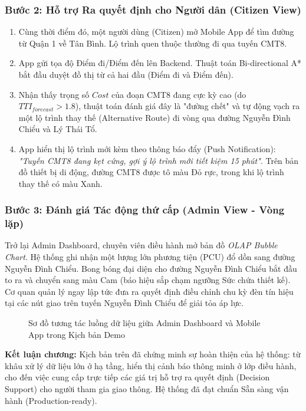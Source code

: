 \subsubsection{Bước 2: Hỗ trợ Ra quyết định cho Người dân (Citizen View)}
\begin{enumerate}
    \item Cùng thời điểm đó, một người dùng (Citizen) mở Mobile App để tìm đường từ Quận 1 về Tân Bình. Lộ trình quen thuộc thường đi qua tuyến CMT8.
    \item App gửi tọa độ Điểm đi/Điểm đến lên Backend. Thuật toán Bi-directional A* bắt đầu duyệt đồ thị từ cả hai đầu (Điểm đi và Điểm đến).
    \item Nhận thấy trọng số $Cost$ của đoạn CMT8 đang cực kỳ cao (do $TTI_{forecast} > 1.8$), thuật toán đánh giá đây là "đường chết" và tự động vạch ra một lộ trình thay thế (Alternative Route) đi vòng qua đường Nguyễn Đình Chiểu và Lý Thái Tổ.
    \item App hiển thị lộ trình mới kèm theo thông báo đẩy (Push Notification): \textit{"Tuyến CMT8 đang kẹt cứng, gợi ý lộ trình mới tiết kiệm 15 phút"}. Trên bản đồ thiết bị di động, đường CMT8 được tô màu Đỏ rực, trong khi lộ trình thay thế có màu Xanh.
\end{enumerate}

\subsubsection{Bước 3: Đánh giá Tác động thứ cấp (Admin View - Vòng lặp)}
Trở lại Admin Dashboard, chuyên viên điều hành mở bản đồ \textit{OLAP Bubble Chart}. Hệ thống ghi nhận một lượng lớn phương tiện (PCU) đổ dồn sang đường Nguyễn Đình Chiểu. Bong bóng đại diện cho đường Nguyễn Đình Chiểu bắt đầu to ra và chuyển sang màu Cam (báo hiệu sắp chạm ngưỡng Sức chứa thiết kế). Cơ quan quản lý ngay lập tức đưa ra quyết định điều chỉnh chu kỳ đèn tín hiệu tại các nút giao trên tuyến Nguyễn Đình Chiểu để giải tỏa áp lực.

\begin{figure}[H]
    \centering
    \caption{Sơ đồ tương tác luồng dữ liệu giữa Admin Dashboard và Mobile App trong Kịch bản Demo}
    \label{fig:demo_end_to_end}
\end{figure}

\vspace{0.5cm}
\textbf{Kết luận chương:} Kịch bản trên đã chứng minh sự hoàn thiện của hệ thống: từ khâu xử lý dữ liệu lớn ở hạ tầng, hiển thị cảnh báo thông minh ở lớp điều hành, cho đến việc cung cấp trực tiếp các giá trị hỗ trợ ra quyết định (Decision Support) cho người tham gia giao thông. Hệ thống đã đạt chuẩn Sẵn sàng vận hành (Production-ready).